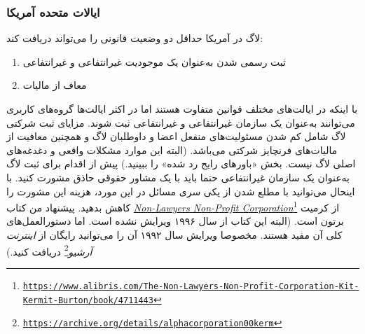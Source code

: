 \subsubsection{ایالات متحده آمریکا}
لاگ در آمریکا حداقل دو وضعیت قانونی را می‌تواند دریافت کند:

\begin{enumerate}
\item
ثبت رسمی شدن به‌عنوان یک موجودیت غیرانتفاعی و غیرانتفاعی
\item
معاف از مالیات
\end{enumerate}

با اینکه در ایالت‌های مختلف قوانین متفاوت هستند اما در اکثر ایالت‌ها
گروه‌های کاربری می‌توانند به‌عنوان یک سازمان غیرانتفاعی و غیرانتفاعی ثبت شوند.
مزایای ثبت شرکتی لاگ شامل کم شدن مسئولیت‌های منفعل اعضا و داوطلبان لاگ
و همچنین معافیت از مالیات‌های فرنچایز شرکتی می‌باشد.
(البته این موارد مشکلات واقعی و دغدغه‌های اصلی لاگ نیست.
بخش «باورهای رایج رد شده» را ببینید.)
پیش از اقدام برای ثبت لاگ به‌عنوان یک سازمان غیرانتفاعی حتما
باید با یک مشاور حقوقی حاذق مشورت کنید. با اینحال می‌توانید با مطلع شدن
از یکی سری مسائل در این مورد، هزینه این مشورت را کاهش بدهید.
پیشنهاد من کتاب
\emph{\url{Non-Lawyers Non-Profit Corporation}}\footnote{\texttt{\url{https://www.alibris.com/The-Non-Lawyers-Non-Profit-Corporation-Kit-Kermit-Burton/book/4711443}}}
از کرمیت برتون است. (البته این کتاب از سال ۱۹۹۶ ویرایش نشده است.
اما دستورالعمل‌های کلی آن مفید هستند. مخصوصا ویرایش سال ۱۹۹۲ آن
را می‌توانید رایگان از
\emph{اینترنت آرشیو}\footnote{\texttt{\url{https://archive.org/details/alphacorporation00kerm}}}
دریافت کنید.)

